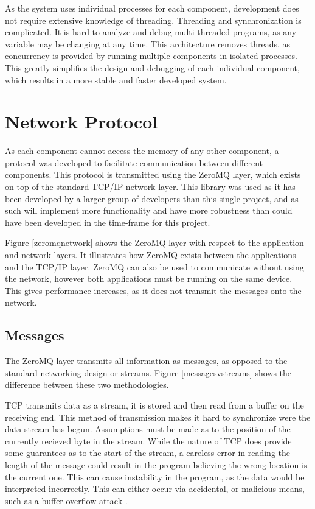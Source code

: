 As the system uses individual processes for each component, development does not require extensive knowledge of threading. Threading and synchronization is complicated. It is hard to analyze and debug multi-threaded programs, as any variable may be changing at any time. This architecture removes threads, as concurrency is provided by running multiple components in isolated processes. This greatly simplifies the design and debugging of each individual component, which results in a more stable and faster developed system.

\section{Network Protocol}

As each component cannot access the memory of any other component, a protocol was developed to facilitate communication between different components. This protocol is transmitted using the ZeroMQ layer, which exists on top of the standard TCP/IP network layer. This library was used as it has been developed by a larger group of developers than this single project, and as such will implement more functionality and have more robustness than could have been developed in the time-frame for this project.


Figure \ref{zeromqnetwork} shows the ZeroMQ layer with respect to the application and network layers. It illustrates how ZeroMQ exists between the applications and the TCP/IP layer. ZeroMQ can also be used to communicate without using the network, however both applications must be running on the same device. This gives performance increases, as it does not transmit the messages onto the network.

\subsection{Messages}

The ZeroMQ layer transmits all information as messages, as opposed to the standard networking design or streams. Figure \ref{messagesvstreams} shows the difference between these two methodologies.


TCP transmits data as a stream, it is stored and then read from a buffer on the receiving end. This method of transmission makes it hard to synchronize were the data stream has begun. Assumptions must be made as to the position of the currently recieved byte in the stream. While the nature of TCP does provide some  guarantees as to the start of the stream, a careless error in reading the length of the message could result in the program believing the wrong location is the current one. This can cause instability in the program, as the data would be interpreted incorrectly. This can either occur via accidental, or malicious means, such as a buffer overflow attack \cite{bufferoverflow}. 

